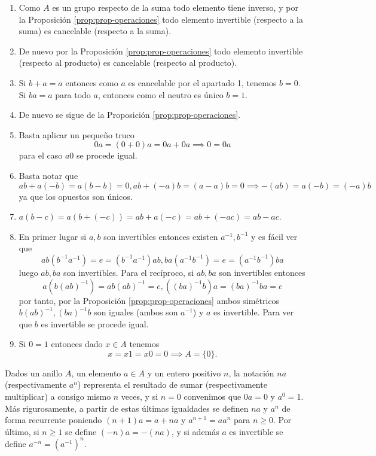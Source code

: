 \begin{proofbox}
    \begin{enumerate}
        \item Como $A$ es un grupo respecto de la suma todo elemento tiene inverso, y por la Proposición \ref{prop:prop-operaciones} todo elemento invertible (respecto a la suma) es cancelable (respecto a la suma).
        \item De nuevo por la Proposición \ref{prop:prop-operaciones} todo elemento invertible (respecto al producto) es cancelable (respecto al producto).
        \item Si $b + a = a$ entonces como $a$ es cancelable por el apartado 1, tenemos $b=0$. Si $ba=a$ para todo $a$, entonces como el neutro es único $b=1$.
        \item De nuevo se sigue de la Proposición \ref{prop:prop-operaciones}.
        \item Basta aplicar un pequeño truco
        \[
        0a=(0+0)a = 0a + 0a \implies 0 = 0a
        \]
        para el caso $a0$ se procede igual.
        \item Basta notar que
        \[
        ab + a(-b) = a(b-b) = 0, ab + (-a)b = (a-a)b = 0 \implies -(ab)=a(-b) = (-a)b 
        \]
        ya que los opuestos son únicos.
        \item $a(b-c)=a(b+(-c))=ab+a(-c)=ab+(-ac)=ab-ac$.
        \item En primer lugar si $a,b$ son invertibles entonces existen $a^{-1},b^{-1}$ y es fácil ver que
        \[
        ab(b^{-1}a^{-1})=e=(b^{-1}a^{-1})ab, ba(a^{-1}b^{-1})=e=(a^{-1}b^{-1})ba
        \]
        luego $ab,ba$ son invertibles. Para el recíproco, si $ab,ba$ son invertibles entonces
        \[
        a(b(ab)^{-1})=ab(ab)^{-1}=e, ((ba)^{-1}b)a=(ba)^{-1}ba=e
        \]
        por tanto, por la Proposición \ref{prop:prop-operaciones} ambos simétricos $b(ab)^{-1},(ba)^{-1}b$ son iguales (ambos son $a^{-1}$) y $a$ es invertible. Para ver que $b$ es invertible se procede igual.
        \item Si $0=1$ entonces dado $x \in A$ tenemos
        \[
        x = x1 = x0 = 0 \implies A=\{0\}.
        \]
    \end{enumerate}
\end{proofbox}

Dados un anillo $A$, un elemento $a \in A$ y un entero positivo $n$, la notación $na$ (respectivamente $a^n$) representa el resultado de sumar (respectivamente multiplicar) a consigo mismo $n$ veces, y si $n = 0$ convenimos que $0a = 0$ y $a^0 = 1$. Más rigurosamente, a partir de estas últimas igualdades se definen $na$ y $a^n$ de forma recurrente poniendo $(n + 1)a = a + na$ y $a^{n+1} = aa^n$ para $n \geq 0$. Por último, si $n \geq 1$ se define $(-n)a = -(na)$, y si además $a$ es invertible se define $a^{-n} = (a^{-1})^n$.

